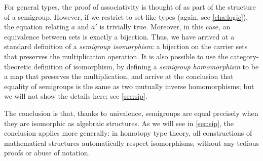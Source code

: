 For general types, the proof of associativity is thought of as part of
the structure of a semigroup.  However, if we restrict to set-like types
(again, see \cref{cha:logic}), the
equation relating $a$ and $a'$ is trivially true.  Moreover, in this
case, an equivalence between sets is exactly a bijection.  Thus, we have
arrived at a standard definition of a \emph{semigroup isomorphism}: a
bijection on the carrier sets that preserves the multiplication
operation.  It is also possible to use the category-theoretic definition
of isomorphism, by defining a \emph{semigroup homomorphism} to be a map
that preserves the multiplication, and arrive at the conclusion that equality of
semigroups is the same as two mutually inverse homomorphisms; but we
will not show the details here; see \cref{sec:sip}.

The conclusion is that, thanks to univalence, semigroups are equal
precisely when they are isomorphic as algebraic structures. As we will see in \cref{sec:sip}, the
conclusion applies more generally: in homotopy type theory, all constructions of
mathematical structures automatically respect isomorphisms, without any
tedious proofs or abuse of notation.